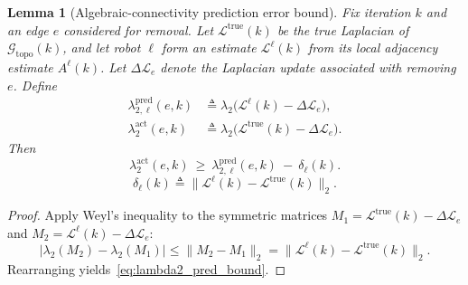 \documentclass[conference]{IEEEconf}
\theoremstyle{plain}
\newtheorem{lemma}{Lemma}     %
\begin{document}
\begin{lemma}[Algebraic-connectivity prediction error bound]
\label{lem:lambda2_prediction_bound}
Fix iteration $k$ and an edge $e$ considered for removal. Let $\mathcal{L}^{\mathrm{true}}(k)$ be the true Laplacian of
$\mathcal{G}_{\mathrm{topo}}(k)$, and let robot $\ell$ form an estimate $\mathcal{L}^{\ell}(k)$ from its local adjacency estimate
$A^\ell(k)$. Let $\Delta\mathcal{L}_{e}$ denote the Laplacian update associated with removing $e$. Define
\begin{align}
\lambda_{2,\ell}^{\mathrm{pred}}(e,k)
&\triangleq
\lambda_2\!\Big(\mathcal{L}^{\ell}(k)-\Delta\mathcal{L}_{e}\Big),
\label{eq:lambda2_pred_def}\\
\lambda_{2}^{\mathrm{act}}(e,k)
&\triangleq
\lambda_2\!\Big(\mathcal{L}^{\mathrm{true}}(k)-\Delta\mathcal{L}_{e}\Big).
\label{eq:lambda2_act_def}
\end{align}
Then
\begin{equation}
\lambda_{2}^{\mathrm{act}}(e,k)
\ \ge\
\lambda_{2,\ell}^{\mathrm{pred}}(e,k)\ -\ \delta_\ell(k).
\label{eq:lambda2_pred_bound}
\end{equation}
\begin{equation}
\delta_\ell(k)\triangleq
\big\|\mathcal{L}^{\ell}(k)-\mathcal{L}^{\mathrm{true}}(k)\big\|_2 .
\label{eq:delta_def}
\end{equation}
\end{lemma}

\begin{proof}
Apply Weyl's inequality to the symmetric matrices
$M_1=\mathcal{L}^{\mathrm{true}}(k)-\Delta\mathcal{L}_{e}$ and
$M_2=\mathcal{L}^{\ell}(k)-\Delta\mathcal{L}_{e}$:
\[
\big|\lambda_2(M_2)-\lambda_2(M_1)\big|
\le
\|M_2-M_1\|_2
=
\big\|\mathcal{L}^{\ell}(k)-\mathcal{L}^{\mathrm{true}}(k)\big\|_2.
\]
Rearranging yields~\eqref{eq:lambda2_pred_bound}.
\end{proof}
\end{document}
